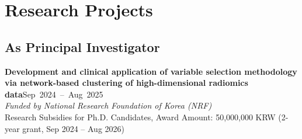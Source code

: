\documentclass[10pt,a4paper]{article}
\newenvironment{projlist}{%
    \renewcommand{\labelenumi}{\color{headercolor}[\theenumi]}%
    \begin{etaremune}[leftmargin=2em, itemsep=0.3em]%
}{\end{etaremune}}
\begin{document}
\section*{Research Projects}

\subsection*{As Principal Investigator}
\begin{projlist}
    \item \textbf{Development and clinical application of variable selection methodology via network-based clustering of high-dimensional radiomics data}\hfill{}\hspace*{\fill}\mbox{Sep 2024 -- Aug 2025}\\
    \textit{Funded by National Research Foundation of Korea (NRF)}\\
    Research Subsidies for Ph.D. Candidates, Award Amount: 50,000,000 KRW (2-year grant, Sep 2024 -- Aug 2026)
\end{projlist}
\end{document}
